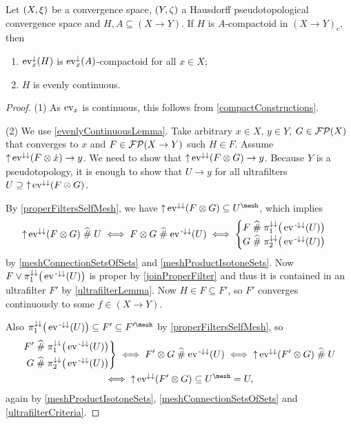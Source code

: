 \begin{proposition} \label{compactoidImpliesEvenContinuity}
Let $\sSet{X,\xi}$ be a convergence space, $\sSet{Y, \zeta}$ a Hausdorff pseudotopological convergence space and $H, A\subseteq (X\to Y)$. If $H$ is $A$-compactoid in $(X\to Y)_c$, then
\begin{enumerate}
\item $\operatorname{ev}_x^\downarrow(H)$ is $\operatorname{ev}_x^\downarrow(A)$-compactoid for all $x\in X$;
\item $H$ is evenly continuous.
\end{enumerate}
\end{proposition}
\begin{proof}
(1) As $\operatorname{ev}_x$ is continuous, this follows from \ref{compactConstructions}.

(2) We use \ref{evenlyContinuousLemma}. Take arbitrary $x\in X$, $y\in Y$, $G\in \operatorname{\mathcal{FP}}(X)$ that converges to $x$ and $F\in \operatorname{\mathcal{FP}}(X\to Y)$ such $H\in F$. Assume $\operatorname{\uparrow}\operatorname{ev}^{\downarrow\downarrow}(F\otimes \dot{x})\to y$. We need to show that $\operatorname{\uparrow}\operatorname{ev}^{\downarrow\downarrow}(F\otimes G) \to y$. Because $Y$ is a pseudotopology, it is enough to show that $U\to y$ for all ultrafilters $U\supseteq \operatorname{\uparrow}\operatorname{ev}^{\downarrow\downarrow}(F\otimes G)$.

By \ref{properFiltersSelfMesh}, we have $\upset\evalMap^{\imf\imf}(F\otimes G) \subseteq U^\mesh$, which implies
\[ \operatorname{\uparrow}\operatorname{ev}^{\downarrow\downarrow}(F\otimes G) \mathrel{\widehat{\#}} U \iff F\otimes G \mathrel{\widehat{\#}} \operatorname{ev}^{{\text{\hspace{0.15em}-}\downarrow}\downarrow}(U) \iff \begin{cases}
F \mathrel{\widehat{\#}} \pi_1^{\downarrow\downarrow}\big(\operatorname{ev}^{{\text{\hspace{0.15em}-}\downarrow}\downarrow}(U)\big) \\
G \mathrel{\widehat{\#}} \pi_2^{\downarrow\downarrow}\big(\operatorname{ev}^{{\text{\hspace{0.15em}-}\downarrow}\downarrow}(U)\big)
\end{cases} \]
by \ref{meshConnectionSetsOfSets} and \ref{meshProductIsotoneSets}. Now $F \vee \pi_1^{\downarrow\downarrow}\big(\operatorname{ev}^{{\text{\hspace{0.15em}-}\downarrow}\downarrow}(U)\big)$ is proper by \ref{joinProperFilter} and thus it is contained in an ultrafilter $F'$ by \ref{ultrafilterLemma}. Now $H\in F\subseteq F'$, so $F'$ converges continuously to some $f\in (X\to Y)$.

Also $\pi_1^{\imf\imf}\big(\evalMap^{\preimf\imf}(U)\big) \subseteq F' \subseteq F^{\prime\mesh}$ by \ref{properFiltersSelfMesh}, so
\begin{multline*}
\left.\begin{aligned}F' \amesh \pi_1^{\imf\imf}\big(\evalMap^{\preimf\imf}(U)\big) \\
G \amesh \pi_2^{\imf\imf}\big(\evalMap^{\preimf\imf}(U)\big)\end{aligned}\right\} \iff  F'\otimes G \amesh \evalMap^{\preimf\imf}(U) \iff \upset\evalMap^{\imf\imf}(F'\otimes G) \amesh U \\
\iff \upset\evalMap^{\imf\imf}(F'\otimes G) \subseteq U^\mesh = U,
\end{multline*}
again by \ref{meshProductIsotoneSets}, \ref{meshConnectionSetsOfSets} and \ref{ultrafilterCriteria}.


\end{proof}
